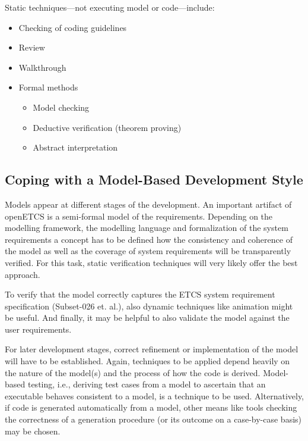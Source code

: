 Static \vv techniques---not executing model or code---include:
\begin{itemize}
\item Checking of coding guidelines
\item Review
\item Walkthrough
\item Formal methods
\begin{itemize}
\item Model checking
\item Deductive verification (theorem proving)
\item Abstract interpretation
\end{itemize}
\end{itemize}

%


\subsection*{Coping with a Model-Based Development Style}

Models appear at different stages of the development. An important
artifact of openETCS is a semi-formal model of the requirements. 
Depending on the modelling framework, the modelling language and
formalization of the system requirements a
concept has to be defined how the consistency and coherence of the
model as well as the coverage of system requirements will be
transparently verified. For this task, static verification techniques
will very likely offer the best approach.

To verify that the model correctly captures the ETCS system
requirement specification (Subset-026 et. al.), also dynamic techniques
like animation might be useful. And finally, it may be helpful to also
validate the model against the user requirements.

For later development stages, correct refinement or implementation of
the model will have to be established. Again, techniques to be applied
depend heavily on the nature of the model(s) and the process of how
the code is derived. Model-based testing, i.e., deriving test cases
from a model to ascertain that an executable behaves consistent to a
model, is a technique to be used. Alternatively, if code is generated
automatically from a model, other means like tools checking the
correctness of a generation procedure (or its outcome on a
case-by-case basis) may be chosen.

